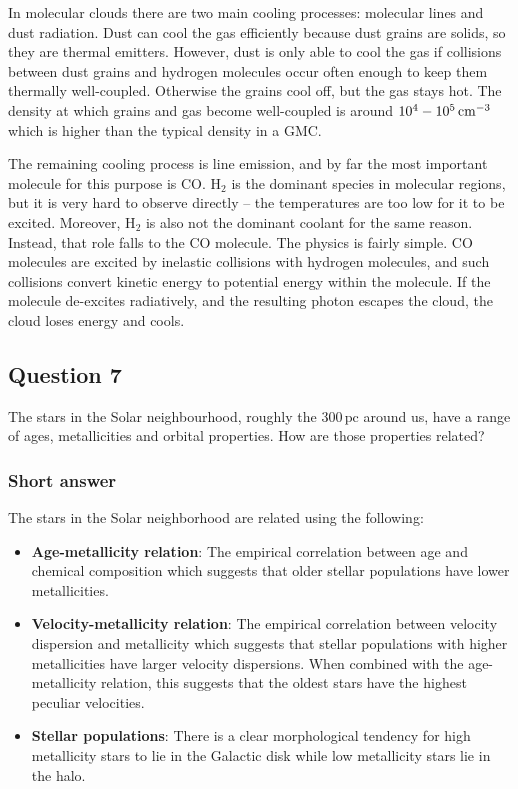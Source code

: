 \documentclass[a4paper,10pt]{article}
\begin{document}
{\noindent}In molecular clouds there are two main cooling processes: molecular lines and dust radiation. Dust can cool the gas efficiently because dust grains are solids, so they are thermal emitters. However, dust is only able to cool the gas if collisions between dust grains and hydrogen molecules occur often enough to keep them thermally well-coupled. Otherwise the grains cool off, but the gas stays hot. The density at which grains and gas become well-coupled is around $10^4-10^5\,{\rm cm^{-3}}$ which is higher than the typical density in a GMC.

{\noindent}The remaining cooling process is line emission, and by far the most important molecule for this purpose is CO. H$_2$ is the dominant species in molecular regions, but it is very hard to observe directly -- the temperatures are too low for it to be excited. Moreover, H$_2$ is also not the dominant coolant for the same reason. Instead, that role falls to the CO molecule. The physics is fairly simple. CO molecules are excited by inelastic collisions with hydrogen molecules, and such collisions convert kinetic energy to potential energy within the molecule. If the molecule de-excites radiatively, and the resulting photon escapes the cloud, the cloud loses energy and cools.



\newpage
\subsection{Question 7}

The stars in the Solar neighbourhood, roughly the $300\,\mathrm{pc}$ around us, have a range of ages, metallicities and orbital properties. How are those properties related?

\subsubsection{Short answer}

The stars in the Solar neighborhood are related using the following:

\begin{itemize}
    \item \textbf{Age-metallicity relation}: The empirical correlation between age and chemical composition which suggests that older stellar populations have lower metallicities.
    \item \textbf{Velocity-metallicity relation}: The empirical correlation between velocity dispersion and metallicity which suggests that stellar populations with higher metallicities have larger velocity dispersions. When combined with the age-metallicity relation, this suggests that the oldest stars have the highest peculiar velocities.
    \item \textbf{Stellar populations}: There is a clear morphological tendency for high metallicity stars to lie in the Galactic disk while low metallicity stars lie in the halo.
\end{itemize}
\end{document}
